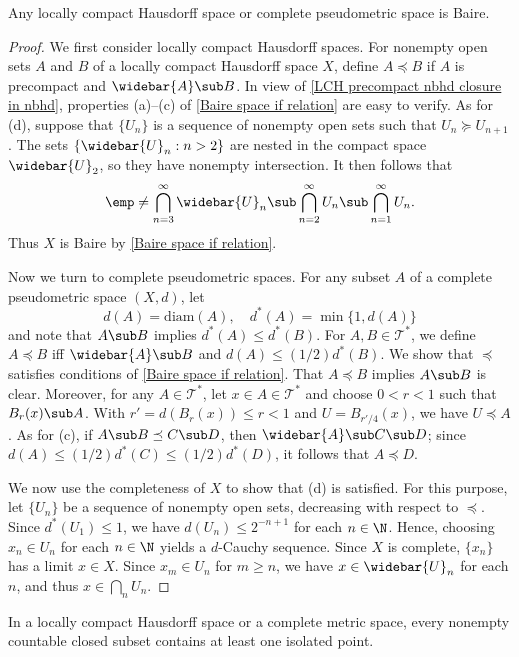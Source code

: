 \begin{theorem}
Any locally compact Hausdorff space or complete pseudometric space is Baire.
\end{theorem}
\begin{proof}
We first consider locally compact Hausdorff spaces. For nonempty open sets $A$ and $B$ of a locally compact Hausdorff space $X$, define $A\preceq B$ if $A$ is precompact and $\widebar{A}\sub B$. In view of \cref{LCH precompact nbhd closure in nbhd}, properties (a)--(c) of \cref{Baire space if relation} are easy to verify. As for (d), suppose that $\{U_n\}$ is a sequence of nonempty open sets such that $U_n\succeq U_{n+1}$. The sets $\{\widebar{U}_n:n>2\}$ are nested in the compact space $\widebar{U}_2$, so they have nonempty intersection. It then follows that
\[\emp\neq\bigcap_{n=3}^{\infty}\widebar{U}_n\sub\bigcap_{n=2}^{\infty}U_n\sub\bigcap_{n=1}^{\infty}U_n.\]
Thus $X$ is Baire by \cref{Baire space if relation}.\par
Now we turn to complete pseudometric spaces. For any subset $A$ of a complete pseudometric space $(X,d)$, let
\[d(A)=\mathrm{diam}(A),\quad d^*(A)=\min\{1,d(A)\}\]
and note that $A\sub B$ implies $d^*(A)\leq d^*(B)$. For $A,B\in\mathcal{T}^*$, we define $A\preceq B$ iff $\widebar{A}\sub B$ and $d(A)\leq(1/2)d^*(B)$. We show that $\preceq$ satisfies conditions of \cref{Baire space if relation}. That $A\preceq B$ implies $A\sub B$ is clear. Moreover, for any $A\in\mathcal{T}^*$, let $x\in A\in\mathcal{T}^*$ and choose $0<r<1$ such that $B_r(x)\sub A$. With $r'=d(B_r(x))\leq r<1$ and $U=B_{r'/4}(x)$, we have $U\preceq A$. As for (c), if $A\sub B\preceq C\sub D$, then $\widebar{A}\sub C\sub D$; since $d(A)\leq (1/2)d^*(C)\leq(1/2)d^*(D)$, it follows that $A\preceq D$.\par
We now use the completeness of $X$ to show that (d) is satisfied. For this purpose, let $\{U_n\}$ be a sequence of nonempty open sets, decreasing with respect to $\preceq$. Since $d^*(U_1)\leq 1$, we have $d(U_n)\leq 2^{-n+1}$ for each $n\in\N$. Hence, choosing $x_n\in U_n$ for each $n\in\N$ yields a $d$-Cauchy sequence. Since $X$ is complete, $\{x_n\}$ has a limit $x\in X$. Since $x_m\in U_n$ for $m\geq n$, we have $x\in\widebar{U}_n$ for each $n$, and thus $x\in\bigcap_nU_n$. 
\end{proof}
\begin{corollary}\label{countable closed isolated}
In a locally compact Hausdorff space or a complete metric space, every nonempty countable closed subset contains at least one isolated point.
\end{corollary}
